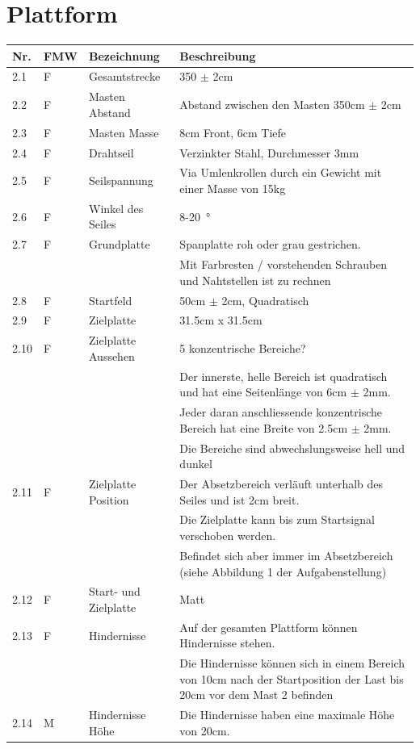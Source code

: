 \documentclass[a4paper]{report}
\begin{document}
\section{Plattform}
\label{app:sec:Plattform}
\begin{tabular}{|p{}|p{}|p{}|p{}|}
	\hline
	\textbf{Nr.} & \textbf{FMW\footnotemark} & \textbf{Bezeichnung} & \textbf{Beschreibung} \\
	\hline
	2.1 & F & Gesamtstrecke & 350 $\pm$ 2cm \\
	\hline
	2.2 & F & Masten Abstand & Abstand zwischen den Masten 350cm $\pm$ 2cm \\
	\hline
	2.3 & F & Masten Masse & 8cm Front, 6cm Tiefe \\
	\hline
	2.4 & F & Drahtseil & Verzinkter Stahl, Durchmesser 3mm \\
	\hline
	2.5 & F & Seilspannung & Via Umlenkrollen durch ein Gewicht mit einer Masse von 15kg \\
	\hline
	2.6 & F & Winkel des Seiles & 8-20\SI{}{\degree}\\
	\hline
	2.7 & F & Grundplatte & Spanplatte roh oder grau gestrichen.\\
	& & & Mit Farbresten / vorstehenden Schrauben und Nahtstellen ist zu rechnen \\
	\hline
	2.8 & F & Startfeld & 50cm $\pm$ 2cm, Quadratisch \\
	\hline
	2.9 & F & Zielplatte & 31.5cm x 31.5cm \\
	\hline
	2.10 & F & Zielplatte Aussehen & 5 konzentrische Bereiche?\\
	& & & Der innerste, helle Bereich ist quadratisch und hat eine Seitenlänge von 6cm $\pm$ 2mm. \\
	& & & Jeder daran anschliessende konzentrische Bereich hat eine Breite von 2.5cm $\pm$ 2mm. \\
	& & & Die Bereiche sind abwechslungsweise hell und dunkel \\
	\hline
	2.11 & F & Zielplatte Position & Der Absetzbereich verläuft unterhalb des Seiles und ist 2cm breit.\\
	& & & Die Zielplatte kann bis zum Startsignal verschoben werden.\\
	& & & Befindet sich aber immer im Absetzbereich (siehe Abbildung 1 der Aufgabenstellung) \\
	\hline
	2.12 & F & Start- und Zielplatte & Matt \\
	\hline
	2.13 & F & Hindernisse & Auf der gesamten Plattform können Hindernisse stehen.\\
	& & & Die Hindernisse können sich in einem Bereich von 10cm nach der Startposition der Last bis 20cm vor dem Mast 2 befinden  \\
	\hline
	2.14 & M & Hindernisse Höhe & Die Hindernisse haben eine maximale Höhe von 20cm. \\
	\hline
\end{tabular}
\end{document}
